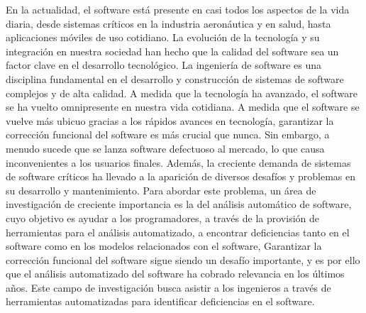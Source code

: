 


En la actualidad, el software está presente en casi todos los aspectos de la vida diaria, desde sistemas críticos en la industria aeronáutica y en salud, hasta aplicaciones móviles de uso cotidiano. La evolución de la tecnología y su integración en nuestra sociedad han hecho que la calidad del software sea un factor clave en el desarrollo tecnológico.  La ingeniería de software es una disciplina fundamental en el desarrollo y construcción de sistemas de software complejos y de alta calidad. A medida que la tecnología ha avanzado, el software se ha vuelto omnipresente en nuestra vida cotidiana. A medida que el software se vuelve más ubicuo gracias a los rápidos avances en tecnología, garantizar la corrección funcional del software es más crucial que nunca. Sin embargo, a menudo sucede que se lanza software defectuoso al mercado, lo que causa inconvenientes a los usuarios finales. Además, la creciente demanda de sistemas de software críticos ha llevado a la aparición de diversos desafíos y problemas en su desarrollo y mantenimiento.
Para abordar este problema, un área de investigación de creciente importancia es la del análisis automático de software, cuyo objetivo es ayudar a los programadores, a través de la provisión de herramientas para el análisis automatizado, a encontrar deficiencias tanto en el software
como en los modelos relacionados con el software, Garantizar la corrección funcional del software sigue siendo un desafío importante, y es por ello que el análisis automatizado del software ha cobrado relevancia en los últimos años. Este campo de investigación busca asistir a los ingenieros a través de herramientas automatizadas para identificar deficiencias en el software.



